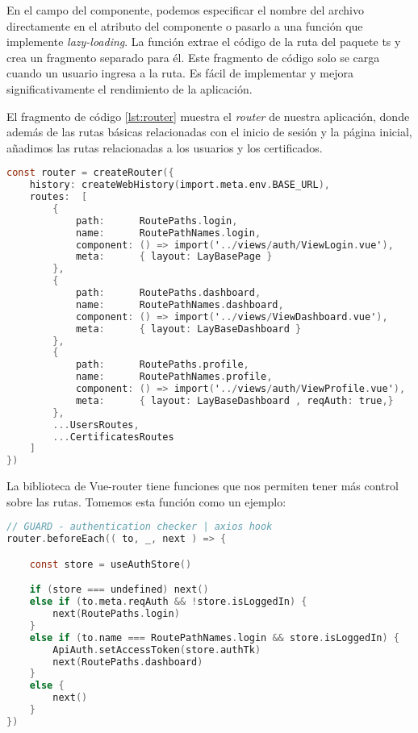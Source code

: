 En el campo del componente, podemos especificar el nombre del archivo directamente en el atributo del componente o pasarlo a una función que implemente \textit{lazy-loading}. La función extrae el código de la ruta del paquete ts y crea un fragmento separado para él. Este fragmento de código solo se carga cuando un usuario ingresa a la ruta. Es fácil de implementar y mejora significativamente el rendimiento de la aplicación.

El fragmento de código \ref{lst:router} muestra el \textit{router} de nuestra aplicación, donde además de las rutas básicas relacionadas con el inicio de sesión y la página inicial, añadimos las rutas relacionadas a los usuarios y los certificados. 

\begin{lstlisting}[language=C,caption={Configuración de las rutas}, label={lst:router}]
const router = createRouter({
    history: createWebHistory(import.meta.env.BASE_URL),
    routes:  [
        {
            path:      RoutePaths.login,
            name:      RoutePathNames.login,
            component: () => import('../views/auth/ViewLogin.vue'),
            meta:      { layout: LayBasePage }
        },
        {
            path:      RoutePaths.dashboard,
            name:      RoutePathNames.dashboard,
            component: () => import('../views/ViewDashboard.vue'),
            meta:      { layout: LayBaseDashboard }
        },
        {
            path:      RoutePaths.profile,
            name:      RoutePathNames.profile,
            component: () => import('../views/auth/ViewProfile.vue'),
            meta:      { layout: LayBaseDashboard , reqAuth: true,}
        },
        ...UsersRoutes,
        ...CertificatesRoutes
    ]
})
\end{lstlisting}

La biblioteca de Vue-router tiene funciones que nos permiten tener más control sobre las rutas. Tomemos esta función como un ejemplo:

\begin{lstlisting}[language=C,caption={Función para controlar el acceso a rutas}, label={lst:routerAccess}]
// GUARD - authentication checker | axios hook
router.beforeEach(( to, _, next ) => {

    const store = useAuthStore() 

    if (store === undefined) next()
    else if (to.meta.reqAuth && !store.isLoggedIn) {
        next(RoutePaths.login)
    }
    else if (to.name === RoutePathNames.login && store.isLoggedIn) {            
        ApiAuth.setAccessToken(store.authTk)                                    
        next(RoutePaths.dashboard)
    }
    else {
        next()                                                                  
    }
})
\end{lstlisting}

